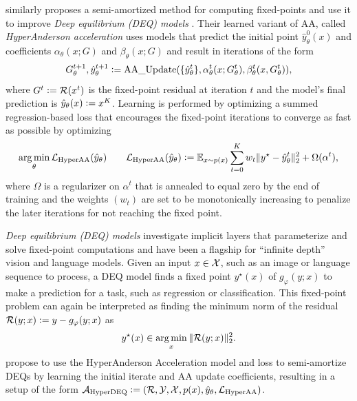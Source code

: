 \documentclass[twoside,11pt]{article}
\begin{document}
\citet{bai2022neural} similarly proposes a semi-amortized
method for computing fixed-points and use it to
improve \emph{Deep equilibrium (DEQ) models}
\citep{bai2019deep,bai2020multiscale,gurumurthy2021joint}.
Their learned variant of AA, called \emph{HyperAnderson acceleration}
uses models that predict the initial point $\hat y^0_\theta(x)$
and coefficients $\alpha_\theta(x; G)$ and $\beta_\theta(x; G)$
and result in iterations of the form
\begin{equation}
  G^{t+1}_\theta, \hat y^{t+1}_\theta \vcentcolon=
  {\rm AA\_Update}(\{\hat y^t_\theta\},
    \alpha^t_\theta(x; G^t_\theta), \beta^t_\theta(x, G^t_\theta)),
  \label{eq:hyperaa}
\end{equation}
where $G^t\vcentcolon= {\mathcal{R}}(x^t)$ is the fixed-point residual at
iteration $t$ and the model's final prediction is
$\hat y_\theta(x)\vcentcolon= x^K$.
Learning is performed by optimizing a summed regression-based loss
that encourages the fixed-point iterations to converge
as fast as possible by optimizing
\begin{equation}
  \operatorname*{arg\,min}_\theta {\mathcal{L}}_{\rm HyperAA}(\hat y_\theta) \qquad {\mathcal{L}}_{\rm HyperAA}(\hat y_\theta) \vcentcolon= \operatorname{\mathbb{E}}_{x\sim p(x)} \sum_{t=0}^K w_t \|y^\star - \hat y_\theta^t\|_2^2 + \Omega(\alpha^t),
  \label{eq:hyperaa-loss}
\end{equation}
where $\Omega$ is a regularizer on $\alpha^t$ that is annealed
to equal zero by the end of training and the
weights $(w_t)$ are set to be monotonically increasing to
penalize the later iterations for not reaching the fixed point.

\emph{Deep equilibrium (DEQ) models} \citep{bai2019deep,bai2020multiscale}
investigate implicit layers that parameterize and solve
fixed-point computations and have been a flagship for
``infinite depth'' vision and language models.
Given an input $x\in{\mathcal{X}}$, such as an image or language sequence
to process, a DEQ model finds a fixed point $y^\star(x)$
of $g_\varphi(y; x)$ to make a prediction for a task,
such as regression or classification.
This fixed-point problem can again be interpreted as
finding the minimum norm of the residual
${\mathcal{R}}(y; x)\vcentcolon= y-g_\varphi(y;x)$
as
\begin{equation}
  y^\star(x)\in \operatorname*{arg\,min}_x \|{\mathcal{R}}(y; x)\|_2^2.
  \label{eq:deq-opt}
\end{equation}
\citet{bai2022neural} propose to use the HyperAnderson Acceleration
model and loss to semi-amortize DEQs by learning the initial
iterate and AA update coefficients, resulting in a setup of the form
${\mathcal{A}}_{\rm HyperDEQ}\vcentcolon=({\mathcal{R}}, {\mathcal{Y}}, {\mathcal{X}}, p(x), \hat y_\theta, {\mathcal{L}}_{\rm HyperAA})$.
\end{document}
